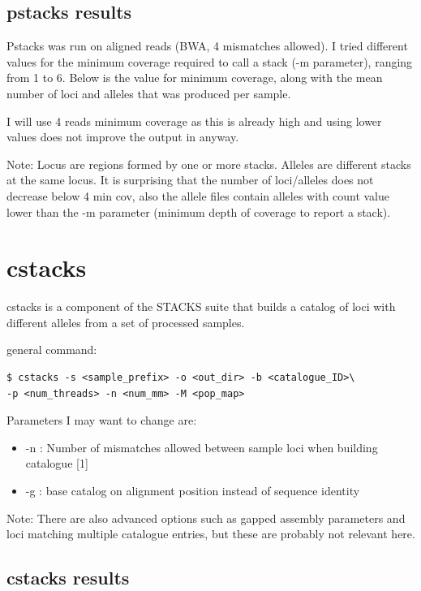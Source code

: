 \documentclass[10pt,a4paper]{report}
\begin{document}
\subsection{pstacks results}

Pstacks was run on aligned reads (BWA, 4 mismatches allowed). I tried different values for the minimum coverage required to call a stack (-m parameter), ranging from 1 to 6. Below is the value for minimum coverage, along with the mean number of loci and alleles that was produced per sample.

\vspace{10px}
\vspace{10px}

I will use 4 reads minimum coverage as this is already high and using lower values does not improve the output in anyway.

Note: Locus are regions formed by one or more stacks. Alleles are different stacks at the same locus. It is surprising that the number of loci/alleles does not decrease below 4 min cov, also the allele files contain alleles with count value lower than the -m parameter (minimum depth of coverage to report a stack).

\section{cstacks}

cstacks is a component of the STACKS suite that builds a catalog of loci with different alleles from a set of processed samples.

general command: 
\begin{lstlisting}
$ cstacks -s <sample_prefix> -o <out_dir> -b <catalogue_ID>\
-p <num_threads> -n <num_mm> -M <pop_map>
\end{lstlisting}

Parameters I may want to change are: 
\begin{itemize}
\item -n : Number of mismatches allowed between sample loci when building catalogue [1]
\item -g : base catalog on alignment position instead of sequence identity
\end{itemize}

Note: There are also advanced options such as gapped assembly parameters and loci matching multiple catalogue entries, but these are probably not relevant here.
\subsection{cstacks results}
\end{document}
